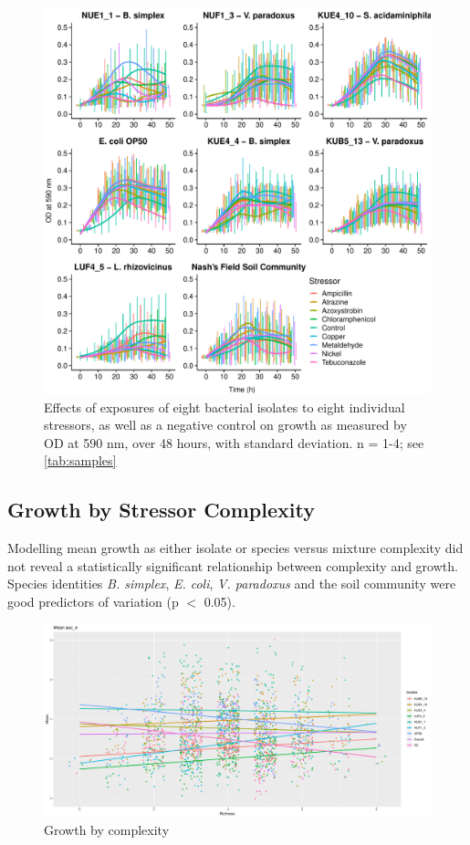 \documentclass[final,1p,times]{elsarticle}
\begin{document}
\begin{figure}[H]
    \centering
    \includegraphics[width = \textwidth]{Scripts/Results/Final_Pipeline/single_stressor_plots.pdf}
    \caption{Effects of exposures of eight bacterial isolates to eight individual stressors, as well as a negative control on growth as measured by OD at 590 nm, over 48 hours, with standard deviation. n = 1-4; see \cref{tab:samples}}
    \label{fig:sstress}
\end{figure}

\newpage
\subsection{Growth by Stressor Complexity}
\label{S:3:4}

Modelling mean growth as either isolate or species versus mixture complexity did not reveal a statistically significant relationship between complexity and growth. Species identities \textit{B. simplex}, \textit{E. coli}, \textit{V. paradoxus} and the soil community were good predictors of variation (p $<$ 0.05).

\begin{figure}[H]
    \centering
    \includegraphics[width = \textwidth]{Scripts/Results/Final_Pipeline/growthXrichness.pdf}
    \caption{Growth by complexity}
    \label{fig:growthXcomplex}
\end{figure}
\end{document}
